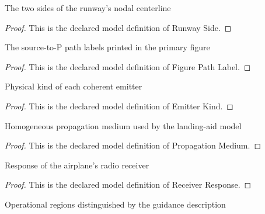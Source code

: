 \begin{definition}
  \label{def:physics:phyx-mini-0247:phyxminiproblems-problemphyxmini0247-runwayside}
  The two sides of the runway's nodal centerline
\end{definition}
\begin{proof}
  This is the declared model definition of Runway Side.
\end{proof}
\begin{definition}
  \label{def:physics:phyx-mini-0247:phyxminiproblems-problemphyxmini0247-figurepathlabel}
  The source-to-P path labels printed in the primary figure
\end{definition}
\begin{proof}
  This is the declared model definition of Figure Path Label.
\end{proof}
\begin{definition}
  \label{def:physics:phyx-mini-0247:phyxminiproblems-problemphyxmini0247-emitterkind}
  Physical kind of each coherent emitter
\end{definition}
\begin{proof}
  This is the declared model definition of Emitter Kind.
\end{proof}
\begin{definition}
  \label{def:physics:phyx-mini-0247:phyxminiproblems-problemphyxmini0247-propagationmedium}
  Homogeneous propagation medium used by the landing-aid model
\end{definition}
\begin{proof}
  This is the declared model definition of Propagation Medium.
\end{proof}
\begin{definition}
  \label{def:physics:phyx-mini-0247:phyxminiproblems-problemphyxmini0247-receiverresponse}
  Response of the airplane's radio receiver
\end{definition}
\begin{proof}
  This is the declared model definition of Receiver Response.
\end{proof}
\begin{definition}
  \label{def:physics:phyx-mini-0247:phyxminiproblems-problemphyxmini0247-guidanceregion}
  Operational regions distinguished by the guidance description
\end{definition}
